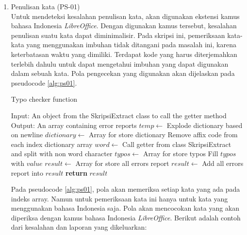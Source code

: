 \begin{enumerate}
	\item Penulisan kata (PS-01) \\
	Untuk mendeteksi kesalahan penulisan kata, akan digunakan ekstensi kamus bahasa Indonesia \textit{LibreOffice}. Dengan digunakan kamus tersebut, kesalahan penulisan suatu kata dapat diminimalisir. Pada skripsi ini, pemeriksaan kata-kata yang menggunakan imbuhan tidak ditangani pada masalah ini, karena keterbatasan waktu yang dimiliki. Terdapat kode yang harus diterjemahkan terlebih dahulu untuk dapat mengetahui imbuhan yang dapat digunakan dalam sebuah kata. Pola pengecekan yang digunakan akan dijelaskan pada pseudocode \ref{alg:ps01}.
		
\begin{minipage}{1.0\linewidth}
\begin{algorithm}[H]
    \caption{Typo checker function}
	\label{alg:ps01}
	\begin{algorithmic}[1]
    		\State Input: An object from the SkripsiExtract class to call the getter method
			\State Output: An array containing error reports		
			\State $temp \gets$ Explode dictionary based on newline
			\State $dictionary \gets$ Array for store dictionary
				\State Remove affix code from each index dictionary array 
			\EndFor
			\State $word \gets$ Call getter from class SkripsiExtract and split with non word character
			\State $typos \gets$ Array for store typos
                	\State Fill $typos$ with $value$
            	\EndIf
        	\EndFor
			\State $result \gets$ Array for store all errors report
                \State $result \gets$ Add all errors report into $result$
            \EndIf
    		\State \textbf{return} $result$
    	\EndFunction
	\end{algorithmic}
\end{algorithm}
\end{minipage}
\medskip

	Pada pseudocode \ref{alg:ps01}, pola akan memeriksa setiap kata yang ada pada indeks array. Namun untuk pemeriksaan kata ini hanya untuk kata yang menggunakan bahasa Indonesia saja. Pola akan mencocokan kata yang akan diperiksa dengan kamus bahasa Indonesia \textit{LibreOffice}. Berikut adalah contoh dari kesalahan dan laporan yang dikeluarkan:
	

\end{enumerate}
